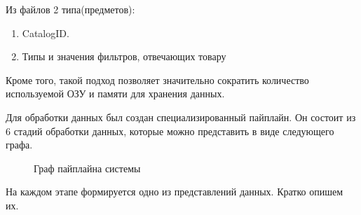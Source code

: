 \documentclass[14pt]{mmcs_article}
\newenvironment{myenumerate}
{ \begin{enumerate}
		\setlength{\itemsep}{0pt}
		\setlength{\parskip}{0pt}
		\setlength{\parsep}{0pt}     }
	{ \end{enumerate}                  }
\begin{document}
Из файлов 2 типа(предметов):

\begin{myenumerate}
	\item CatalogID.
	\item Типы и значения фильтров, отвечающих товару
\end{myenumerate}

Кроме того, такой подход позволяет значительно сократить количество используемой ОЗУ и памяти для хранения данных.

Для обработки данных был создан специализированный пайплайн. Он состоит из 6 стадий обработки данных, которые можно представить в виде следующего графа.

\begin{figure}[H]
\caption{Граф пайплайна системы}\label{stud:fig:2}
\end{figure}
На каждом этапе формируется одно из представлений данных. Кратко опишем их.
\end{document}
